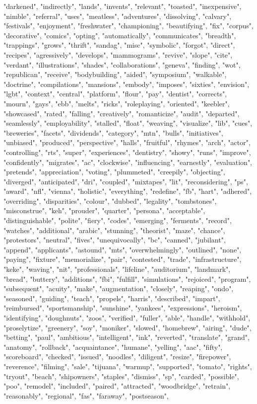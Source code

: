 "darkened", "indirectly", "lands", "invents", "relevant", "toasted", "inexpensive", "nimble", "referral", "uses", "meatless", "adventures", "dissolving", "calvary", "festivals", "enjoyment", "freshwater", "championing", "beautifying", "fix", "corpus", "decorative", "comics", "opting", "automatically", "communicates", "breadth", "trappings", "grows", "thrift", "sandag", "misc", "symbolic", "forgot", "direct", "recipes", "agressively", "develops", "mammograms", "revive", "slope", "cite", "verdant", "illustrations", "shades", "collaborations", "geneva", "finding", "wot", "republican", "receive", "bodybuilding", "aided", "symposium", "walkable", "doctrine", "compilations", "mansions", "embody", "imposes", "sixties", "envision", "lgbt", "context", "central", "platform", "flour", "pay", "dentist", "corrects", "mourn", "gays", "ebb", "melts", "ricks", "roleplaying", "oriented", "keebler", "showcased", "rated", "falling", "creatively", "romanticize", "audit", "departed", "seamlessly", "employability", "stalled", "float", "weaving", "visualize", "lib", "cues", "breweries", "facets", "dividends", "category", "mtn", "bulls", "initiatives", "unbiased", "produced", "perspective", "halls", "fruitful", "rhymes", "arch", "actor", "controlling", "rts", "super", "experiences", "dentistry", "showy", "runs", "improve", "confidently", "migrates", "ac", "clockwise", "influencing", "earnestly", "evaluation", "pretends", "appreciation", "voting", "plummeted", "creepily", "objecting", "diverged", "anticipated", "dri", "coupled", "mixtapes", "lit", "reconsidering", "ps", "award", "nfl", "vienna", "holistic", "everything", "redefine", "fb", "hart", "adhered", "overriding", "disparities", "colour", "dubbed", "legality", "tombstones", "misconstrue", "keh", "prouder", "quarter", "persona", "acceptable", "distinguishable", "polite", "fiery", "codes", "emerging", "ferments", "record", "watches", "additional", "arabic", "stunning", "theorist", "maze", "chance", "protestors", "neutral", "fives", "unequivocally", "bc", "canned", "jubilant", "append", "applicants", "astound", "mts", "overwhelmingly", "outlined", "none", "paying", "fixture", "memorialize", "pair", "contested", "trade", "infrastructure", "keke", "waving", "nit", "professionals", "lifeline", "auditorium", "landmark", "bread", "buttery", "additions", "fbi", "fulfill", "simulations", "rejoiced", "program", "subsequent", "acuity", "make", "augmentation", "closely", "reaping", "ondo", "seasoned", "guiding", "teach", "propels", "harris", "described", "impart", "reimbursed", "sportsmanship", "sunshine", "yankees", "expressions", "heroism", "identifying", "doughnuts", "zoos", "verified", "fuller", "able", "handle", "withhold", "proselytize", "greenery", "soy", "moniker", "slowed", "homebrew", "airing", "dude", "betting", "paul", "ambitious", "intelligent", "ink", "reverted", "translate", "grand", "anatomy", "rollback", "acquaintance", "humane", "yelling", "aac", "fifty", "scoreboard", "checked", "issued", "noodles", "diligent", "resize", "firepower", "reverence", "filming", "sale", "tijuana", "warmup", "supported", "tomato", "rights", "tryout", "beach", "shipowners", "staples", "dismiss", "sp", "carded", "possible", "poo", "remodel", "included", "paired", "attracted", "woodbridge", "retrain", "reasonably", "regional", "fas", "faraway", "postseason", 